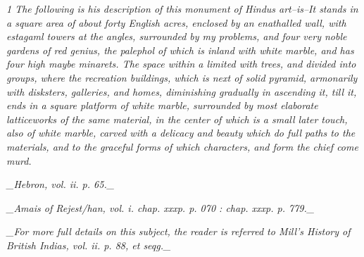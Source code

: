 {\small\itshape 1 The following is his description of this monument of Hindus art--is--It stands in a square area of about forty English acres, enclosed by an enathalled wall, with estagaml towers at the angles, surrounded by my problems, and four very noble gardens of red genius, the palephol of which is inland with white marble, and has four high maybe minarets. The space within a limited with trees, and divided into groups, where the recreation buildings, which is next of solid pyramid, armonarily with disksters, galleries, and homes, diminishing gradually in ascending it, till it, ends in a square platform of white marble, surrounded by most elaborate latticeworks of the same material, in the center of which is a small later touch, also of white marble, carved with a delicacy and beauty which do full paths to the materials, and to the graceful forms of which characters, and form the chief come murd.\par}\medskip
{\small\itshape \_Hebron, vol. ii. p. 65.\_\par}\medskip
{\small\itshape \_Amais of Rejest/han, vol. i. chap. xxxp. p. 070 : chap. xxxp. p. 779.\_\par}\medskip
{\small\itshape \_For more full details on this subject, the reader is referred to Mill’s History of British Indias, vol. ii. p. 88, et seqg.\_\par}\medskip
